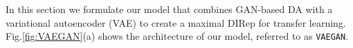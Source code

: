 \documentclass{article}
\newcommand\todo[1]{\textcolor{red}{#1}}
\newcommand{\elisa}[1]{\textbf{\color{red}Elisa: #1}}
\newcommand{\markw}[1]{\textbf{\color{green}Mark: #1}}
\begin{document}
%






\label{alg}
In this section we formulate 
our model that combines GAN-based DA with a variational autoencoder (VAE) to create a maximal DIRep for transfer learning. Fig.\ref{fig:VAEGAN}(a) shows the architecture of our model, referred to as \verb"VAEGAN".
\end{document}
